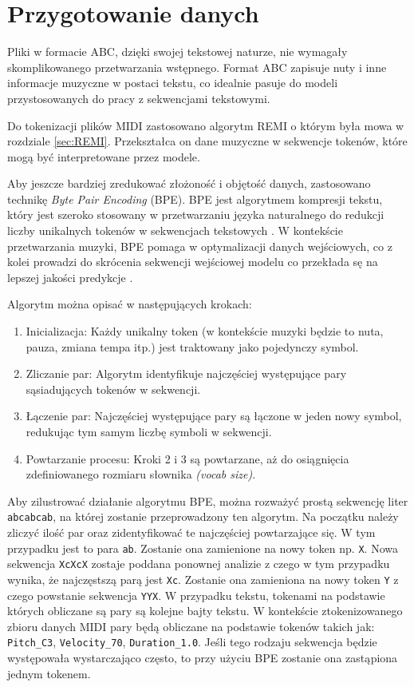 \documentclass[data-science]{agh-wi} %
\begin{document}
\section{Przygotowanie danych}
Pliki w formacie ABC, dzięki swojej tekstowej naturze, nie wymagały skomplikowanego przetwarzania wstępnego. Format ABC zapisuje nuty i inne informacje muzyczne w postaci tekstu, co idealnie pasuje do modeli przystosowanych do pracy z sekwencjami tekstowymi.

Do tokenizacji plików MIDI zastosowano algorytm REMI o którym była mowa w rozdziale \ref*{sec:REMI}. Przekształca on dane muzyczne w sekwencje tokenów, które mogą być interpretowane przez modele.

Aby jeszcze bardziej zredukować złożoność i objętość danych, zastosowano technikę \textit{Byte Pair Encoding} (BPE). BPE jest algorytmem kompresji tekstu, który jest szeroko stosowany w przetwarzaniu języka naturalnego do redukcji liczby unikalnych tokenów w sekwencjach tekstowych \cite{bpe}. W kontekście przetwarzania muzyki, BPE pomaga w optymalizacji danych wejściowych, co z kolei prowadzi do skrócenia sekwencji wejściowej modelu co przekłada sę na lepszej jakości predykcje \cite*{fradet2023byte}.

\noindent Algorytm można opisać w następujących krokach:

\begin{enumerate}
    \item Inicializacja: Każdy unikalny token (w kontekście muzyki będzie to nuta, pauza, zmiana tempa itp.) jest traktowany jako pojedynczy symbol.
    \item Zliczanie par: Algorytm identyfikuje najczęściej występujące pary sąsiadujących tokenów w sekwencji.
    \item Łączenie par: Najczęściej występujące pary są łączone w jeden nowy symbol, redukując tym samym liczbę symboli w sekwencji.
    \item Powtarzanie procesu: Kroki 2 i 3 są powtarzane, aż do osiągnięcia zdefiniowanego rozmiaru słownika \textit{(vocab size)}.
\end{enumerate}

\noindent Aby zilustrować działanie algorytmu BPE, można rozważyć prostą sekwencję liter \texttt{abcabcab}, na której zostanie przeprowadzony ten algorytm. Na początku należy zliczyć ilość par oraz zidentyfikować te najczęściej powtarzające się. W tym przypadku jest to para \texttt{ab}. Zostanie ona zamienione na nowy token np. \texttt{X}. Nowa sekwencja \texttt{XcXcX} zostaje poddana ponownej analizie z czego w tym przypadku wynika, że najczęstszą parą jest \texttt{Xc}. Zostanie ona zamieniona na nowy token \texttt{Y} z czego powstanie sekwencja \texttt{YYX}. W przypadku tekstu, tokenami na podstawie których obliczane są pary są kolejne bajty tekstu. W kontekście ztokenizowanego zbioru danych MIDI pary będą obliczane na podstawie tokenów takich jak: \texttt{Pitch\_C3}, \texttt{Velocity\_70}, \texttt{Duration\_1.0}. Jeśli tego rodzaju sekwencja będzie występowała wystarczająco często, to przy użyciu BPE zostanie ona zastąpiona jednym tokenem.
\end{document}
